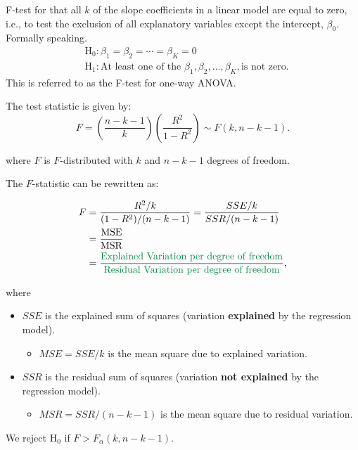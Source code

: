 \documentclass[
  12pt,
  letterpaper,
]{scrbook}
\providecommand{\tightlist}{%
  \setlength{\itemsep}{0pt}\setlength{\parskip}{0pt}}
\newcommand{\green}[1]{\color[RGB]{0, 139, 69}{#1}}
\renewcommand{\tightlist}{\setlength{\itemsep}{0.5\baselineskip}\setlength{\parskip}{0.2\baselineskip}}
\theoremstyle{plain}
\theoremstyle{definition}
\theoremstyle{remark}
\begin{document}
F-test for that all \(k\) of the slope coefficients in a linear model
are equal to zero, i.e., to test the exclusion of all explanatory
variables {except the intercept}, \(\beta_0\). Formally speaking. \[
\begin{aligned}
&\text{H}_0: \beta_1 = \beta_2 = \cdots = \beta_K=0 \\
&\text{H}_1: \text{At least one of the } \beta_1, \beta_2,\ldots, \beta_K,\text{is not zero.}
\end{aligned}
\] This is referred to as the {F-test} for {one-way ANOVA}.

The test statistic is given by: \[
F = \left(\frac{n-k-1}{k}\right) \left(\frac{R^2}{1-R^2}\right) \sim F(k, n-k-1) .
\]

where \(F\) is \(F\)-distributed with \(k\) and \(n-k-1\) degrees of
freedom.

The \(F\)-statistic can be rewritten as:

\[
\begin{split}
F &= \frac{R^2/k}{(1-R^2)/(n-k-1)} = \frac{SSE/k}{SSR/(n-k-1)} \\
&= \frac{\text{MSE}}{\text{MSR}} \\
& = \frac{\text{\green{Explained} Variation per degree of freedom}}{\text{\green{Residual} Variation per degree of freedom}} ,
\end{split}
\]

where

\begin{itemize}
\tightlist
\item
  \(SSE\) is the explained sum of squares (variation \textbf{explained}
  by the regression model).

  \begin{itemize}
  \tightlist
  \item
    \(MSE = SSE/k\) is the mean square due to explained variation.
  \end{itemize}
\item
  \(SSR\) is the residual sum of squares (variation \textbf{not
  explained} by the regression model).

  \begin{itemize}
  \tightlist
  \item
    \(MSR = SSR/(n-k-1)\) is the mean square due to residual variation.
  \end{itemize}
\end{itemize}

We reject \(\text{H}_0\) if \(F>F_{\alpha}(k, n-k-1)\).
\end{document}
